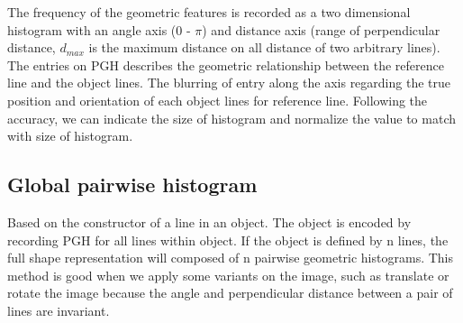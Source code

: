 The frequency of the geometric features is recorded as a two dimensional histogram with an angle axis (0 - $\pi$) and distance axis (range of perpendicular distance, $d_{max}$ is the maximum distance on all distance of two arbitrary lines). The entries on PGH describes the geometric relationship between the reference line and the object lines. The blurring of entry along the axis regarding the true position and orientation of each object lines for reference line. Following the accuracy, we can indicate the size of histogram and normalize the value to match with size of histogram.
\subsection{Global pairwise histogram}
Based on the constructor of a line in an object. The object is encoded by recording PGH for all lines within object. If the object is defined by n lines, the full shape representation will composed of n pairwise geometric histograms. This method is good when we apply some variants on the image, such as translate or rotate the image because the angle and perpendicular distance between a pair of lines are invariant.
